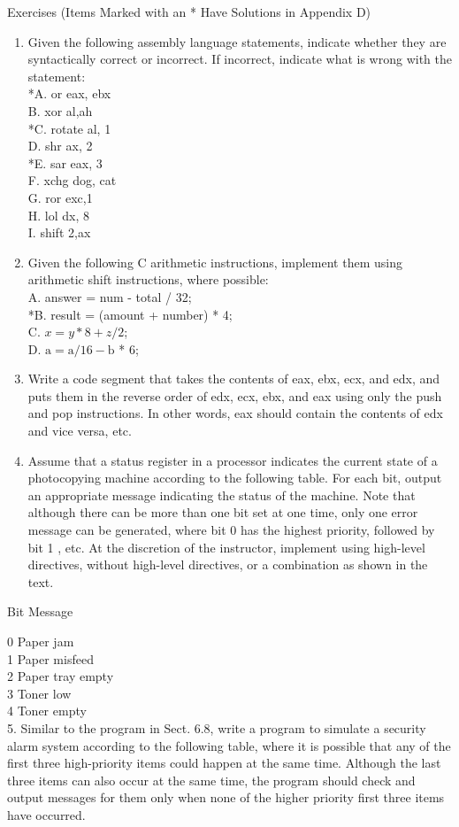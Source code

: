 \documentclass[10pt]{book}
\begin{document}
Exercises (Items Marked with an * Have Solutions in Appendix D)
\begin{enumerate}
  \item Given the following assembly language statements, indicate whether they are syntactically correct or incorrect. If incorrect, indicate what is wrong with the statement:\\
*A. or eax, ebx\\
B. xor al,ah\\
*C. rotate al, 1\\
D. shr ax, 2\\
*E. sar eax, 3\\
F. xchg dog, cat\\
G. ror exc,1\\
H. lol dx, 8\\
I. shift 2,ax
  \item Given the following C arithmetic instructions, implement them using arithmetic shift instructions, where possible:\\
A. answer = num - total / 32;\\
*B. result = (amount + number) * 4;\\
C. $x=y * 8+z / 2$;\\
D. $\mathrm{a}=\mathrm{a} / 16-\mathrm{b}$ * 6;
  \item Write a code segment that takes the contents of eax, ebx, ecx, and edx, and puts them in the reverse order of edx, ecx, ebx, and eax using only the push and pop instructions. In other words, eax should contain the contents of edx and vice versa, etc.
  \item Assume that a status register in a processor indicates the current state of a photocopying machine according to the following table. For each bit, output an appropriate message indicating the status of the machine. Note that although there can be more than one bit set at one time, only one error message can be generated, where bit 0 has the highest priority, followed by bit 1 , etc. At the discretion of the instructor, implement using high-level directives, without high-level directives, or a combination as shown in the text.
\end{enumerate}

Bit Message

0 Paper jam\\
1 Paper misfeed\\
2 Paper tray empty\\
3 Toner low\\
4 Toner empty\\
5. Similar to the program in Sect. 6.8, write a program to simulate a security alarm system according to the following table, where it is possible that any of the first three high-priority items could happen at the same time. Although the last three items can also occur at the same time, the program should check and output messages for them only when none of the higher priority first three items have occurred.
\end{document}
